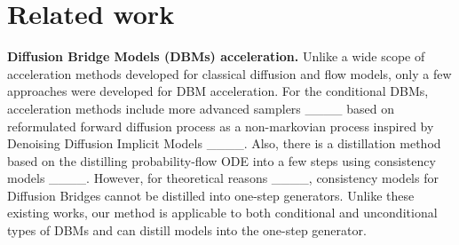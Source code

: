 \section{Related work}
\vspace{-2mm}
\textbf{Diffusion Bridge Models (DBMs) acceleration.} 
Unlike a wide scope of acceleration methods developed for classical diffusion and flow models, only a few approaches were developed for DBM acceleration. 
For the conditional DBMs, acceleration methods include more advanced samplers ____ based on reformulated forward diffusion process as a non-markovian process inspired by Denoising Diffusion Implicit Models ____. 
Also, there is a distillation method based on the distilling probability-flow ODE into a few steps using consistency models ____. 
However, for theoretical reasons ____, consistency models for Diffusion Bridges cannot be distilled into one-step generators. 
Unlike these existing works, our method is applicable to both conditional and unconditional types of DBMs and can distill models into the one-step generator.


